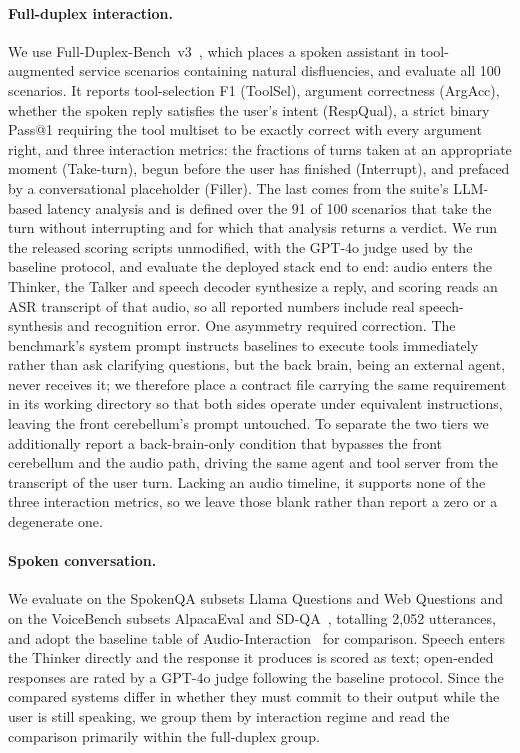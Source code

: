 \paragraph{Full-duplex interaction.}
We use Full-Duplex-Bench~v3~\cite{fullduplexbench_v3}, which places a spoken assistant in
tool-augmented service scenarios containing natural disfluencies, and evaluate all 100
scenarios. It reports tool-selection F1 (ToolSel), argument correctness (ArgAcc), whether the
spoken reply satisfies the user's intent (RespQual), a strict binary Pass@1 requiring the tool
multiset to be exactly correct with every argument right, and three interaction metrics: the
fractions of turns taken at an appropriate moment (Take-turn), begun before the user has
finished (Interrupt), and prefaced by a conversational placeholder (Filler). The last comes from
the suite's LLM-based latency analysis and is defined over the 91 of 100 scenarios that take the
turn without interrupting and for which that analysis returns a verdict. We run the released
scoring scripts unmodified, with the GPT-4o judge used by the baseline protocol, and evaluate
the deployed stack end to end: audio enters the Thinker, the Talker and speech decoder
synthesize a reply, and scoring reads an ASR transcript of that audio, so all reported numbers
include real speech-synthesis and recognition error. One asymmetry required
correction. The benchmark's system prompt instructs baselines to execute tools immediately
rather than ask clarifying questions, but the back brain, being an external agent, never
receives it; we therefore place a contract file carrying the same requirement in its working
directory so that both sides operate under equivalent instructions, leaving the front
cerebellum's prompt untouched. To separate the two tiers we additionally report a
back-brain-only condition that bypasses the front cerebellum and the audio path, driving the
same agent and tool server from the transcript of the user turn. Lacking an audio timeline, it
supports none of the three interaction metrics, so we leave those blank rather than report a
zero or a degenerate one.

\paragraph{Spoken conversation.}
We evaluate on the SpokenQA subsets Llama Questions and Web Questions and on the VoiceBench
subsets AlpacaEval and SD-QA~\cite{voicebench2025}, totalling 2{,}052 utterances, and adopt
the baseline table of Audio-Interaction~\cite{AudioInteractionModel} for comparison. Speech
enters the Thinker directly and the response it produces is scored as text; open-ended
responses are rated by a GPT-4o judge following the baseline protocol. Since the compared
systems differ in whether they must commit to their output while the user is still speaking, we
group them by interaction regime and read the comparison primarily within the full-duplex
group.

